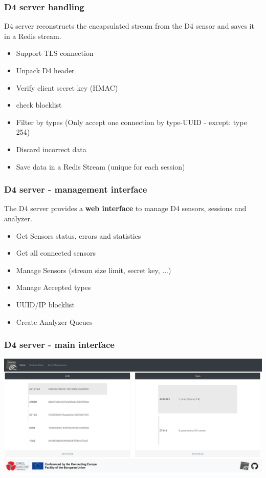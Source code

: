 \documentclass{beamer}
\begin{document}
\begin{frame}
\frametitle{D4 server handling}

D4 server reconstructs the encapsulated stream from the D4 sensor and saves it in a Redis stream.

\begin{itemize}
\item Support TLS connection
\item Unpack D4 header
\item Verify client secret key (HMAC)
\item check blocklist
\item Filter by types (Only accept one connection by type-UUID - except: type 254)
\item Discard incorrect data
\item Save data in a Redis Stream (unique for each session)
\end{itemize}
\end{frame}



\begin{frame}
        \frametitle{D4 server - management interface}
The D4 server provides a {\bf web interface} to manage D4 sensors, sessions and analyzer.
        \begin{itemize}
\item Get Sensors status, errors and statistics
\item Get all connected sensors
\item Manage Sensors (stream size limit, secret key, ...)
\item Manage Accepted types
\item UUID/IP blocklist
\item  Create Analyzer Queues
        \end{itemize}
\end{frame}

\begin{frame}
        \frametitle{D4 server - main interface}
        \includegraphics[width=\textwidth]{./d4-5.png}
\end{frame}
\end{document}
